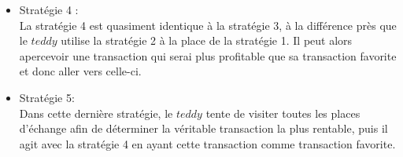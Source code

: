 \documentclass{article}
\begin{document}
\begin{itemize}
    \item Stratégie 4 :\\
    La stratégie 4 est quasiment identique à la stratégie 3, à la différence près que le $teddy$ utilise la stratégie 2 à la place de la stratégie 1. Il peut alors apercevoir une transaction qui serai plus profitable que sa transaction favorite et donc aller vers celle-ci.
    
    \item Stratégie 5: \\
    Dans cette dernière stratégie, le $teddy$ tente de visiter toutes les places d'échange afin de déterminer la véritable transaction la plus rentable, puis il agit avec la stratégie 4 en ayant cette transaction comme transaction favorite. 
\end{itemize}
\end{document}
